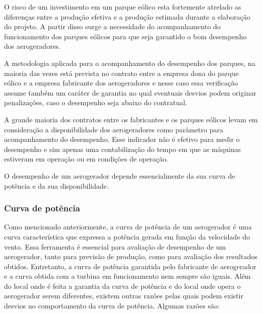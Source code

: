 O risco de um investimento em um parque eólico esta fortemente atrelado as diferenças entre a produção efetiva e a produção estimada durante a elaboração do projeto. A partir disso surge a necessidade do acompanhamento do funcionamento dos parques eólicos para que seja garantido o bom desempenho dos aerogeradores.

A metodologia aplicada para o acompanhamento do desempenho dos parques, na maioria das vezes está prevista no contrato entre a empresa dona do parque eólico e a empresa fabricante dos aerogeradores e nesse caso essa verificação assume também um caráter de garantia no qual eventuais desvios podem originar penalizações, caso o desempenho seja abaixo do contratual.

A grande maioria dos contratos entre os fabricantes e os parques eólicos levam em consideração a disponibilidade dos aerogeradores como parâmetro para acompanhamento do desempenho. Esse indicador não é efetivo para medir o desempenho e sim apenas uma contabilização do tempo em que as máquinas estiveram em operação ou em condições de operação.

O desempenho de um aerogerador depende essencialmente da sua curva de potência e da sua disponibilidade. 

\subsubsection{Curva de potência}
\label{Sec:curvaPotenciaDesempenhoAerogeradores}

Como mencionado anteriormente, a curva de potência de um aerogerador é uma curva característica que expressa a potência gerada em função da velocidade do vento. Essa ferramenta é essencial para avaliação de desempenho de um aerogerador, tanto para previsão de produção, como para avaliação dos resultados obtidos. Entretanto, a curva de potência garantida pelo fabricante de aerogerador e a curva obtida com a turbina em funcionamento nem sempre são iguais. Além do local onde é feita a garantia da curva de potência e do local onde opera o aerogerador serem diferentes, existem outras razões pelas quais podem existir desvios no comportamento da curva de potência. Algumas razões são:

